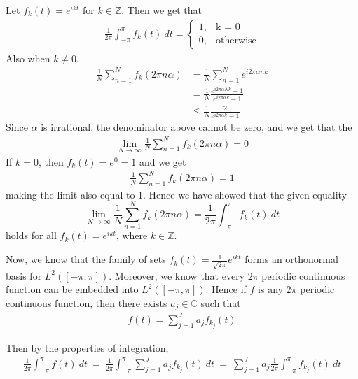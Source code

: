 \documentclass[12pt]{exam}
\theoremstyle{plain} %
\theoremstyle{definition} %
\theoremstyle{remark} %
\begin{document}
\begin{questions}
  \begin{solution}
    Let $f_k(t) = e^{ikt}$ for $k \in \mathbb{Z}$. Then we get that
    \begin{align*}
      \frac{1}{2\pi} \int_{- \pi}^{\pi}  f_k(t) \ dt  =
      \begin{cases}
        1, & \textrm{k = 0} \\
        0, & \textrm{otherwise}
      \end{cases}
    \end{align*}
    Also when $k \neq 0$,
    \begin{align*}
      \frac{1}{N}\sum_{n = 1}^{N} f_k(2 \pi n \alpha) &= \frac{1}{N}
      \sum_{n = 1}^{N} e^{i2 \pi \alpha n k } \\
      &= \frac{1}{N} \frac{e^{i2\pi \alpha Nk} - 1}{e^{i2\pi \alpha k} - 1} \\
      &\le \frac{1}{N} \frac{2}{e^{i2\pi \alpha k} - 1}
    \end{align*}
    Since $\alpha$ is irrational, the denominator above cannot be
    zero, and we get that the
    \begin{align*}
      \lim_{N \to \infty} \frac{1}{N} \sum_{n = 1}^{N} f_k(2 \pi n \alpha) = 0
    \end{align*}
    If $k = 0$, then $f_k(t) = e^{0} = 1$ and we get
    \begin{align*}
      \frac{1}{N} \sum_{n = 1}^{N} f_k(2 \pi n \alpha) = 1
    \end{align*}
    making the limit also equal to 1. Hence we have showed that the
    given equality
    \begin{equation}
      \label{eq:2}
      \lim_{N \to \infty} \frac{1}{N} \sum_{n = 1}^{N} f_k(2 \pi n
      \alpha) = \frac{1}{2\pi}
      \int_{- \pi}^{ \pi}  f_k(t) \ dt
    \end{equation}
    holds for all $f_k(t) = e^{ikt}$, where $k \in \mathbb{Z}$.

    Now, we know that the family of sets $f_k(t) = \frac{1}{\sqrt{2
    \pi}} e^{i k t}$ forms an orthonormal basis for $L^2([-\pi,
    \pi])$. Moreover, we know that every $2\pi$ periodic continuous
    function can be embedded into $L^2([-\pi, \pi])$. Hence if $f$ is
    any $2 \pi$ periodic continuous function, then there exists $a_j
    \in \mathbb{C}$ such that
    \begin{align*}
      f(t) = \sum_{j = 1}^{J} a_j f_{k_j}(t)
    \end{align*}

    Then by the properties of integration,
    \begin{align*}
      \frac{1}{2\pi} \int_{-\pi}^{ \pi}  f(t) \ dt \ = \ \frac{1}{2\pi}
      \int_{-\pi}^{ \pi}  \sum_{j = 1}^{J} a_j f_{k_j}(t) \ dt \ = \
      \sum_{j = 1}^{J} a_{j} \frac{1}{2 \pi} \int_{-\pi}^{\pi}
      f_{k_j}(t) \ dt \\
    \end{align*}


\end{solution}
\end{questions}
\end{document}

